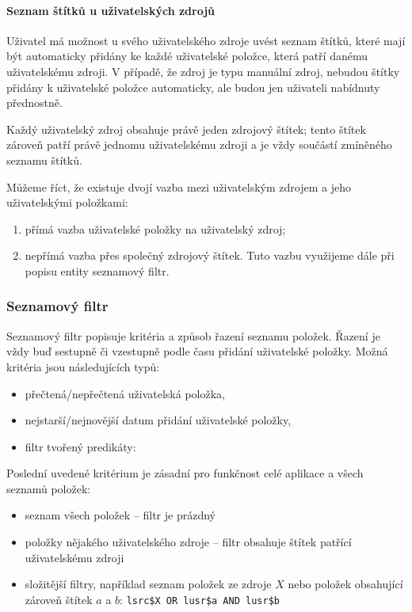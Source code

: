 \paragraph{Seznam štítků u uživatelských zdrojů}
Uživatel má možnost u svého uživatelského zdroje uvést seznam štítků, které mají být automaticky přidány ke každé uživatelské položce, která patří danému uživatelskému zdroji.
V případě, že zdroj je typu manuální zdroj, nebudou štítky přidány k uživatelské položce automaticky, ale budou jen uživateli nabídnuty přednostně.

Každý uživatelský zdroj obsahuje právě jeden zdrojový štítek; tento štítek zároveň patří právě jednomu uživatelskému zdroji a je vždy součástí zmíněného seznamu štítků.

Můžeme říct, že existuje dvojí vazba mezi uživatelským zdrojem a jeho uživatelskými položkami:
\begin{enumerate}
	\item přímá vazba uživatelské položky na uživatelský zdroj;
	\item nepřímá vazba přes společný zdrojový štítek.
		Tuto vazbu využijeme dále při popisu entity seznamový filtr.
\end{enumerate}

\subsubsection{Seznamový filtr}

Seznamový filtr popisuje kritéria a způsob řazení seznamu položek.
Řazení je vždy buď sestupně či vzestupně podle času přidání uživatelské položky.
Možná kritéria jsou následujících typů:
\begin{itemize}
	\item přečtená/nepřečtená uživatelská položka,
	\item nejstarší/nejnovější datum přidání uživatelské položky,
	\item filtr tvořený predikáty: 
\end{itemize}

Poslední uvedené kritérium je zásadní pro funkčnost celé aplikace a všech seznamů položek:
\begin{itemize}
	\item seznam všech položek -- filtr je prázdný
	\item položky nějakého uživatelského zdroje -- filtr obsahuje štítek patřící uživatelskému zdroji
	\item složitější filtry, například seznam položek ze zdroje $X$ nebo položek obsahující zároveň štítek $a$ a $b$:
		\verb|lsrc$X OR lusr$a AND lusr$b|
\end{itemize}

